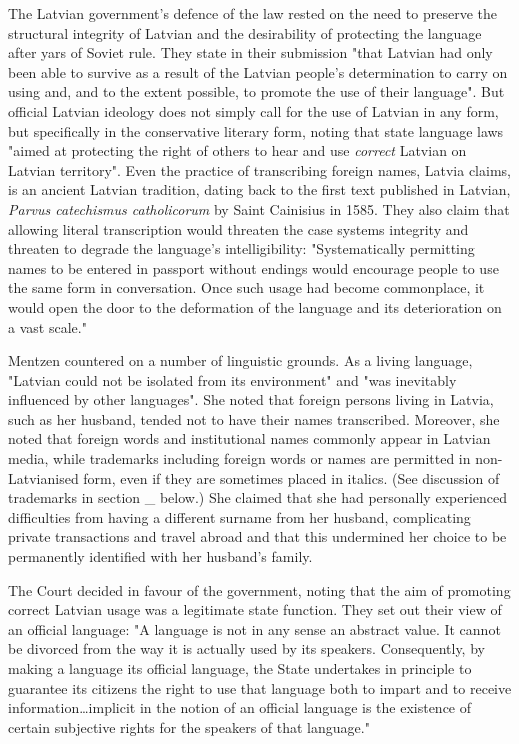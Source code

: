 The Latvian government's defence of the law rested on the need to preserve the structural integrity of Latvian and the desirability of protecting the language after yars of Soviet rule. They state in their submission "that Latvian had only been able to survive as a result of the Latvian people's determination to carry on using and, and to the extent possible, to promote the use of their language". But official Latvian ideology does not simply call for the use of Latvian in any form, but specifically in the conservative literary form, noting that state language laws "aimed at protecting the right of others to hear and use \textit{correct} Latvian on Latvian territory". Even the practice of transcribing foreign names, Latvia claims, is an ancient Latvian tradition, dating back to the first text published in Latvian, \textit{Parvus catechismus catholicorum} by Saint Cainisius in 1585. They also claim that allowing literal transcription would threaten the case systems integrity and threaten to degrade the language's intelligibility: "Systematically permitting names to be entered in passport without endings would encourage people to use the same form in conversation. Once such usage had become commonplace, it would open the door to the deformation of the language and its deterioration on a vast scale."

Mentzen countered on a number of linguistic grounds. As a living language, "Latvian could not be isolated from its environment" and "was inevitably influenced by other languages". She noted that foreign persons living in Latvia, such as her husband, tended not to have their names transcribed. Moreover, she noted that foreign words and institutional names commonly appear in Latvian media, while trademarks including foreign words or names are permitted in non-Latvianised form, even if they are sometimes placed in italics. (See discussion of trademarks in section \_ below.) She claimed that she had personally experienced difficulties from having a different surname from her husband, complicating private transactions and travel abroad and that this undermined her choice to be permanently identified with her husband's family.

The Court decided in favour of the government, noting that the aim of promoting correct Latvian usage was a legitimate state function. They set out their view of an official language: "A language is not in any sense an abstract value. It cannot be divorced from the way it is actually used by its speakers. Consequently, by making a language its official language, the State undertakes in principle to guarantee its citizens the right to use that language both to impart and to receive information…implicit in the notion of an official language is the existence of certain subjective rights for the speakers of that language."

